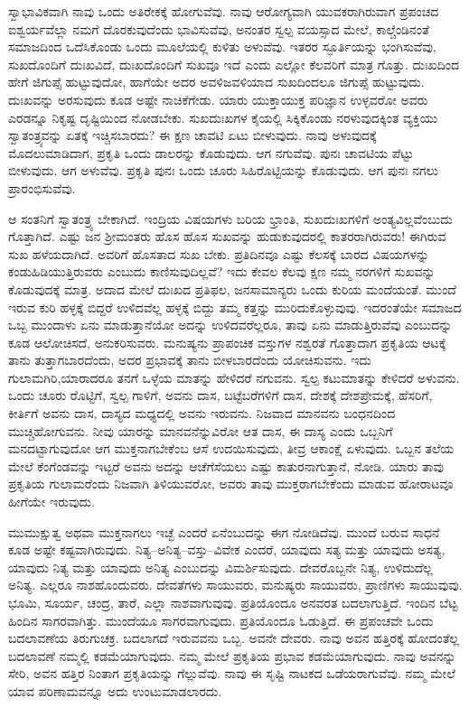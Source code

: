 ಸ್ವಾಭಾವಿಕವಾಗಿ ನಾವು ಒಂದು ಅತಿರೇಕಕ್ಕೆ ಹೋಗುವೆವು. ನಾವು ಆರೋಗ್ಯವಾಗಿ ಯುವಕರಾಗಿರುವಾಗ ಪ್ರಪಂಚದ ಐಶ್ವರ್ಯವೆಲ್ಲಾ ನಮಗೆ ದೊರಕುವುದೆಂದು ಭಾವಿಸುವೆವು, ಅನಂತರ ಸ್ವಲ್ಪ ವಯಸ್ಸಾದ ಮೇಲೆ, ಕಾಲ್ಚೆಂಡಿನಂತೆ ಸಮಾಜದಿಂದ ಒದೆಸಿಕೊಂಡು ಒಂದು ಮೂಲೆಯಲ್ಲಿ ಕುಳಿತು ಅಳುವೆವು. ಇತರರ ಸ್ಫೂರ್ತಿಯನ್ನು ಭಂಗಿಸುವೆವು, ಸುಖದೊಂದಿಗೆ ದುಃಖವಿದೆ, ದುಃಖದೊಂದಿಗೆ ಸುಖವೂ ಇದೆ ಎಂದು ಎಲ್ಲೋ ಕೆಲವರಿಗೆ ಮಾತ್ರ ಗೊತ್ತು. ದುಃಖದಿಂದ ಹೇಗೆ ಜಿಗುಪ್ಸೆ ಹುಟ್ಟುವುದೋ, ಹಾಗೆಯೇ ಅದರ ಅವಳಿಜವಳಿಯಾದ ಸುಖದಿಂದಲೂ ಜಿಗುಪ್ಸೆ ಹುಟ್ಟುವುದು. ದುಃಖವನ್ನು ಅರಸುವುದು ಕೂಡ ಅಷ್ಟೇ ನಾಚಿಕೆಗೇಡು. ಯಾರು ಯುಕ್ತಾಯುಕ್ತ ಪರಿಜ್ಞಾನ ಉಳ್ಳವರೋ ಅವರು ಎರಡನ್ನೂ ನಿಕೃಷ್ಟ ದೃಷ್ಟಿಯಿಂದ ನೋಡಬೇಕು. ಸುಖದುಃಖಗಳ ಕೈಯಲ್ಲಿ ಸಿಕ್ಕಿಕೊಂಡು ನರಳುವುದಕ್ಕಿಂತ ವ್ಯಕ್ತಿಯು ಸ್ವಾತಂತ್ರ್ಯವನ್ನು ಏತಕ್ಕೆ ಇಚ್ಚಿಸಬಾರದು? ಈ ಕ್ಷಣ ಚಾವಟಿ ಏಟು ಬೀಳುವುದು. ನಾವು ಅಳುವುದಕ್ಕೆ ಮೊದಲುಮಾಡಿದಾಗ, ಪ್ರಕೃತಿ ಒಂದು ಡಾಲರನ್ನು ಕೊಡುವುದು. ಆಗ ನಗುವೆವು. ಪುನಃ ಚಾವಟಿಯ ಪೆಟ್ಟು ಬೀಳುವುದು. ಆಗ ಅಳುವೆವು. ಪ್ರಕೃತಿ ಪುನಃ ಒಂದು ಚೂರು ಸಿಹಿರೊಟ್ಟಿಯನ್ನು ಕೊಡುವುದು. ಆಗ ಪುನಃ ನಗಲು ಪ್ರಾರಂಭಿಸುವೆವು.

ಆ ಸಂತನಿಗೆ ಸ್ವಾತಂತ್ರ್ಯ ಬೇಕಾಗಿದೆ. ಇಂದ್ರಿಯ ವಿಷಯಗಳು ಬರಿಯ ಭ್ರಾಂತಿ, ಸುಖದುಃಖಗಳಿಗೆ ಅಂತ್ಯವಿಲ್ಲವೆಂಬುದು ಗೊತ್ತಾಗಿದೆ. ಎಷ್ಟು ಜನ ಶ‍್ರೀಮಂತರು ಹೊಸ ಹೊಸ ಸುಖವನ್ನು ಹುಡುಕುವುದರಲ್ಲಿ ಕಾತರರಾಗಿರುವರು! ಈಗಿರುವ ಸುಖ ಹಳೆಯದಾಗಿದೆ. ಅವರಿಗೆ ಹೊಸತಾದ ಸುಖ ಬೇಕು. ಪ್ರತಿದಿನವೂ ಎಷ್ಟು ಕೆಲಸಕ್ಕೆ ಬಾರದ ವಿಷಯಗಳನ್ನು ಕಂಡುಹಿಡಿಯುತ್ತಿರುವರು ಎಂಬುದು ಕಾಣಿಸುವುದಿಲ್ಲವೆ? ಇದು ಕೇವಲ ಕೆಲವು ಕ್ಷಣ ನಮ್ಮ ನರಗಳಿಗೆ ಸುಖವನ್ನು ಕೊಡುವುದಕ್ಕೆ ಮಾತ್ರ. ಅದಾದ ಮೇಲೆ ದುಃಖದ ಪ್ರತಿಫಲ, ಜನಸಾಮಾನ್ಯರು ಒಂದು ಕುರಿಯ ಮಂದೆಯಂತೆ. ಮುಂದೆ ಇರುವ ಕುರಿ ಹಳ್ಳಕ್ಕೆ ಬಿದ್ದರೆ ಉಳಿದವೆಲ್ಲ ಹಳ್ಳಕ್ಕೆ ಬಿದ್ದು ತಮ್ಮ ಕತ್ತನ್ನು ಮುರಿದುಕೊಳ್ಳುವುವು. ಇದರಂತೆಯೇ ಸಮಾಜದ ಒಬ್ಬ ಮುಂದಾಳು ಏನು ಮಾಡುತ್ತಾನೆಯೋ ಅದನ್ನು ಉಳಿದವರೆಲ್ಲರೂ, ತಾವು ಏನು ಮಾಡುತ್ತಿರುವೆವು ಎಂಬುದನ್ನು ಕೂಡ ಆಲೋಚಿಸದೆ, ಅನುಕರಿಸುವರು. ಮನುಷ್ಯನು ಪ್ರಾಪಂಚಿಕ ವಸ್ತುಗಳ ನಶ್ವರತೆ ಗೊತ್ತಾದಾಗ ಪ್ರಕೃತಿಯ ಆಟಕ್ಕೆ ತಾನು ತುತ್ತಾಗಬಾರದೆಂದು, ಅದರ ಪ್ರಭಾವಕ್ಕೆ ತಾನು ಬೀಳಬಾರದೆಂದು ಯೋಚಿಸುವನು. ಇದು ಗುಲಾಮಗಿರಿ,\break ಯಾರಾದರೂ ತನಗೆ ಒಳ್ಳೆಯ ಮಾತನ್ನು ಹೇಳಿದರೆ ನಗುವನು. ಸ್ವಲ್ಪ ಕಟುಮಾತನ್ನು ಕೇಳಿದರೆ ಅಳುವನು. ಒಂದು ಚೂರು ರೊಟ್ಟಿಗೆ, ಸ್ವಲ್ಪ ಗಾಳಿಗೆ, ಅವನು ದಾಸ, ಬಟ್ಟೆಬರೆಗಳಿಗೆ ದಾಸ, ದೇಶಕ್ಕೆ ದೇಶಪ್ರೇಮಕ್ಕೆ, ಹೆಸರಿಗೆ, ಕೀರ್ತಿಗೆ ಅವನು ದಾಸ, ದಾಸ್ಯದ ಮಧ್ಯದಲ್ಲಿ ಅವನು ಇರುವನು. ನಿಜವಾದ ಮಾನವನು ಬಂಧನದಿಂದ ಮುಚ್ಚಿಹೋಗುವನು. ನೀವು ಯಾರನ್ನು ಮಾನವನೆನ್ನುವಿರೋ ಆತ ದಾಸ, ಈ ದಾಸ್ಯ ಎಂದು ಒಬ್ಬನಿಗೆ ಮನದಟ್ಟಾಗುವುದೋ ಆಗ ಮುಕ್ತನಾಗಬೇಕೆಂಬ ಆಸೆ ಉದಯಿಸುವುದು, ತೀವ್ರ ಆಕಾಂಕ್ಷೆ ಏಳುವುದು. ಒಬ್ಬನ ತಲೆಯ ಮೇಲೆ ಕೆಂಗೆಂಡವನ್ನು ಇಟ್ಟರೆ ಅವನು ಅದನ್ನು ಆಚೆಗೆಸೆಯಲು ಎಷ್ಟು ಕಾತುರನಾಗುತ್ತಾನೆ, ನೋಡಿ. ಯಾರು ತಾವು ಪ್ರಕೃತಿಯ ಗುಲಾಮರೆಂದು ನಿಜವಾಗಿ ತಿಳಿಯುವರೋ, ಅವರು ತಾವು ಮುಕ್ತರಾಗಬೇಕೆಂದು ಮಾಡುವ ಹೋರಾಟವೂ ಹೀಗೆಯೇ ಇರುವುದು.

ಮುಮುಕ್ಷುತ್ವ ಅಥವಾ ಮುಕ್ತನಾಗಲು ಇಚ್ಛೆ ಎಂದರೆ ಏನೆಂಬುದನ್ನು ಈಗ ನೋಡಿದೆವು. ಮುಂದೆ ಬರುವ ಸಾಧನೆ ಕೂಡ ಅಷ್ಟೇ ಕಷ್ಟವಾಗಿರುವುದು. ನಿತ್ಯ–ಅನಿತ್ಯ–\break ವಸ್ತು–ವಿವೇಕ ಎಂದರೆ, ಯಾವುದು ಸತ್ಯ ಮತ್ತು ಯಾವುದು ಅಸತ್ಯ, ಯಾವುದು ನಿತ್ಯ ಮತ್ತು ಯಾವುದು ಅನಿತ್ಯ ಎಂಬುದನ್ನು ವಿಮರ್ಶಿಸುವುದು. ದೇವರೊಬ್ಬನೇ ನಿತ್ಯ, ಉಳಿದುದೆಲ್ಲ ಅನಿತ್ಯ. ಎಲ್ಲರೂ ನಾಶಹೊಂದುವರು. ದೇವತೆಗಳು ಸಾಯುವರು, ಮನುಷ್ಯರು ಸಾಯುವರು, ಪ್ರಾಣಿಗಳು ಸಾಯುವುವು. ಭೂಮಿ, ಸೂರ್ಯ, ಚಂದ್ರ, ತಾರೆ, ಎಲ್ಲಾ ನಾಶವಾಗುವುವು. ಪ್ರತಿಯೊಂದೂ ಅನವರತ ಬದಲಾಗುತ್ತಿದೆ. ಇಂದಿನ ಬೆಟ್ಟ ಹಿಂದಿನ ಸಾಗರವಾಗಿತ್ತು. ಮುಂದೆಯೂ ಸಾಗರವಾಗುವುದು. ಪ್ರತಿಯೊಂದೂ ಓಡುತ್ತಿದೆ. ಈ ಪ್ರಪಂಚವೇ ಒಂದು ಬದಲಾವಣೆಯ ತಿರುಗುಚಕ್ರ. ಬದಲಾಗದೆ ಇರುವವನು ಒಬ್ಬ. ಅವನೇ ದೇವರು. ನಾವು ಅವನ ಹತ್ತಿರಕ್ಕೆ ಹೋದಂತೆಲ್ಲ ಬದಲಾವಣೆ ನಮ್ಮಲ್ಲಿ ಕಡಮೆಯಾಗುವುದು. ನಮ್ಮ ಮೇಲೆ ಪ್ರಕೃತಿಯ ಪ್ರಭಾವ ಕಡಮೆಯಾಗುವುದು. ನಾವು ಅವನನ್ನು ಸೇರಿ, ಅವನ ಹತ್ತಿರ ನಿಂತಾಗ ಪ್ರಕೃತಿಯನ್ನು ಗೆಲ್ಲುವೆವು. ನಾವು ಈ ಸೃಷ್ಟಿ ನಾಟಕದ ಒಡೆಯರಾಗುವೆವು. ನಮ್ಮ ಮೇಲೆ ಯಾವ ಪರಿಣಾಮವನ್ನೂ ಅದು ಉಂಟುಮಾಡಲಾರದು.

